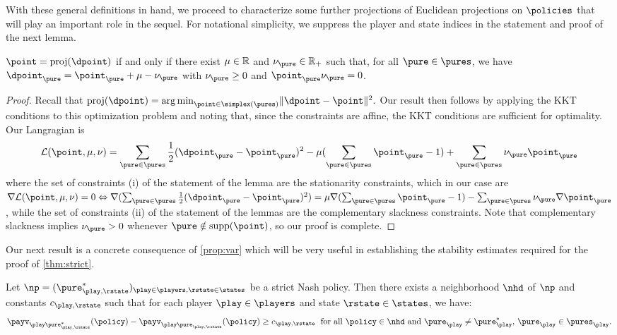With these general definitions in hand, we proceed to characterize some further projections of Euclidean projections on $\policies$ that will play an important role in the sequel.
For notational simplicity, we suppress the player and state indices in the statement and proof of the next lemma.

\begin{lemma}
\label{lem:KKT}
$\point=\proj(\dpoint)$ if and only if there exist $\mu\in \mathbb{R}$ and $\nu_\pure\in\R_{+}$ such that, for all $\pure\in \pures$, we have
$\dpoint_\pure= \point_\pure+\mu-\nu_\pure$
with $\nu_\pure \geq 0$ and $\point_\pure \nu_\pure=0$.
\end{lemma}

\begin{proof}
Recall that 
\(
\proj(\dpoint)
    = \argmin_{\point\in\simplex(\pures)} \norm{\dpoint-\point}^{2}.
\)
Our result then follows by applying the KKT conditions to this optimization problem and noting that, since the constraints are affine, the KKT conditions are sufficient for optimality.
Our Langragian is
\begin{equation}
\mathcal{L}(\point,\mu,\nu)= \sum_{\pure\in\pures}\frac{1}{2}(\dpoint_\pure - \point_\pure )^2-{\mu(\sum_{\pure\in\pures} \point_\pure-1)} + {\sum_{\pure\in\pures} \nu_\pure \point_\pure}
\end{equation}
where the set of constraints (i) of the statement of the lemma  are the stationarity constraints, 
which in our case are $\nabla\mathcal{L}(\point,\mu,\nu)=0\Leftrightarrow
\nabla( \sum_{\pure\in\pures}\frac{1}{2}(\dpoint_\pure - \point_\pure )^2 )=\mu\nabla(\sum_{\pure\in\pures} \point_\pure-1) - \sum_{\pure\in\pures} \nu_\pure\nabla \point_\pure$
, while the set of constraints (ii) of the statement of the lemmas are the complementary slackness constraints.
Note that complementary slackness implies $\nu_\pure>0$ whenever $\pure\notin \supp(\point)$, so our proof is complete.
\end{proof}

Our next result is a concrete consequence of \cref{prop:var} which will be very useful in establishing the stability estimates required for the proof of \cref{thm:strict}.

\begin{lemma}\label{lem:basin of drift}
Let $\np = (\pure^*_{\play,\rstate})_{\play\in\players, \rstate\in\states}$ be a strict Nash policy.
Then there exists a neighborhood $\nhd$ of $\np$ and constants $c_{\play,\rstate}$ such that for each player $\play\in\players$ and state $\rstate\in\states$, we have:
\begin{equation}\label{eq:variational-inequality}
\text{$\payv_{\play\pure_{\play,\rstate}^*}\parens{\policy} - \payv_{\play\pure_{\play,\rstate}}\parens{\policy} \geq c_{\play,\rstate}\;$ for all $\policy\in\nhd$ and $\pure_\play\neq\pure_\play^*$, $\pure_\play\in\pures_\play$.}
\end{equation} 
\end{lemma}



